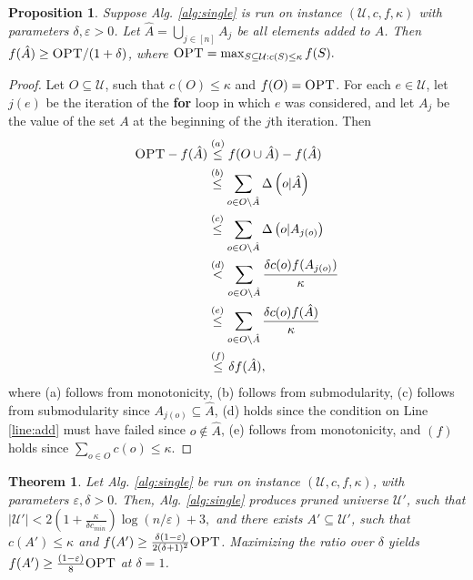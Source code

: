 \documentclass{article}
\newtheorem{proposition}{Proposition}
\newtheorem{theorem}{Theorem}
\theoremstyle{definition}
\newcommand{\uni}{\mathcal{U}}
\newcommand{\epsi}{\varepsilon}
\newcommand{\marge}[2]{ \Delta \left( #1 | #2 \right) }
\newcommand{\opt}{\textsc{OPT}}
\begin{document}
\begin{proposition} \label{prop:opt-ahat}
  Suppose Alg. \ref{alg:single} is run on instance $(\uni,c,f,\kappa )$ with
  parameters $\delta, \epsi > 0$. 
  Let $\hat A = \bigcup_{j \in [n]} A_j$ be all elements added to $A$.
  Then $f( \hat A ) \ge \opt / (1 + \delta )$, where $\opt = \max_{S \subseteq \uni: c(S) \le \kappa } f(S).$
\end{proposition}
\begin{proof}
  Let $O \subseteq \uni$, such that $c(O) \le \kappa$ and $f(O) = \opt$.
  For each $e \in \uni$, let $j(e)$ be the iteration of the \textbf{for}
  loop in which $e$ was considered, and let $A_j$ be the value of the set
  $A$ at the beginning of the $j$th iteration. 
  Then
  \begin{align*}
    \opt - f( \hat A ) &\overset{(a)}{\le } f( O \cup \hat A ) - f( \hat A) \\
                       &\overset{(b)}{\le } \sum_{o \in O \setminus \hat A} \marge{o}{ \hat A } \\
                       &\overset{(c)}{\le} \sum_{o \in O \setminus \hat A} \marge{o}{ A_{j(o)} } \\
                       &\overset{(d)}{<} \sum_{o \in O \setminus \hat A} \frac{\delta c(o) f(A_{j(o)})}{\kappa } \\
                       &\overset{(e)}{\le} \sum_{o \in O \setminus \hat A} \frac{\delta c(o) f( \hat A )}{\kappa } \\
                       &\overset{(f)}{\le} \delta f( \hat A ),
  \end{align*}
  where (a) follows from monotonicity,
  (b) follows from submodularity,
  (c) follows from submodularity since $A_{j(o)} \subseteq \hat A$,
  (d) holds since the condition on Line \ref{line:add} must have failed since $o \not \in \hat A$,
  (e) follows from monotonicity, and $(f)$ holds since $\sum_{o \in O} c(o) \le \kappa$.
\end{proof}
\begin{theorem}
  Let Alg. \ref{alg:single} be run on instance $(\uni, c, f, \kappa)$, with parameters $\epsi, \delta > 0.$
  Then, Alg. \ref{alg:single} produces pruned universe $\uni'$, such that
  $| \uni ' | < 2 \left( 1 + \frac{\kappa }{\delta c_{min} } \right) \log ( n / \epsi ) + 3,$
  and there exists $A' \subseteq \uni'$, such that $c(A') \le \kappa$ and
  $f(A') \ge \frac{\delta (1 - \epsi)}{2(\delta + 1)^2} \opt$.
  Maximizing the ratio over $\delta$ yields $f(A') \ge \frac{(1 - \epsi)}{8} \opt$ at $\delta = 1$. 
\end{theorem}
\end{document}
